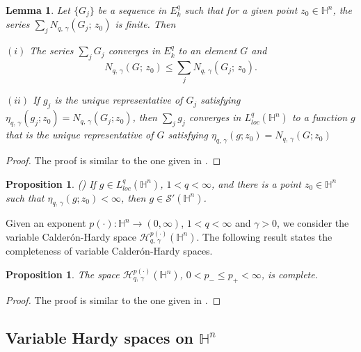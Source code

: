 \documentclass[oneside,10pt]{article}
\newtheorem{lemma}[theorem]{Lemma}
\newtheorem{proposition}[theorem]{Proposition}
\begin{document}
\begin{lemma} \label{series in Eqk} Let $\{ G_{j} \}$ be a sequence in $E^{q}_{k}$ such that for a given point $z_0 \in \mathbb{H}^n$, the series 
$\sum_j N_{q, \, \gamma}(G_{j}; \, z_0 )$ is finite. Then

$(i)$ The series $\sum_j G_j$ converges in $E_{k}^{q}$ to an element $G$ and 
$$N_{q, \, \gamma}(G; \, z_0 ) \leq \sum_j N_{q, \, \gamma}(G_{j}; \, z_0 ).$$

$(ii)$ If $g_j$ is the unique representative of $G_j$ satisfying
$\eta_{q, \, \gamma} (g_j; z_0) = N_{q, \, \gamma}(G_j; z_0)$, then $\sum_j g_j$ converges in $L^{q}_{loc}(\mathbb{H}^{n})$ to a function 
$g$ that is the unique representative of $G$ satisfying $\eta_{q, \, \gamma} (g; z_0) = N_{q, \, \gamma}(G; z_0)$
\end{lemma}

\begin{proof} The proof is similar to the one given in \cite[Lemma 4]{segovia}.
\end{proof}

\begin{proposition} (\cite[Proposition 15]{rocha5}) \label{g distrib}
If $g \in L^{q}_{loc}(\mathbb{H}^{n})$, $1 < q < \infty$, and there is a point $z_0 \in \mathbb{H}^{n}$ such that 
$\eta_{q, \, \gamma} (g ; z_0) < \infty$, then $g \in \mathcal{S}'(\mathbb{H}^{n})$.
\end{proposition}

Given an exponent $p(\cdot): \mathbb{H}^{n} \rightarrow (0, \infty)$, $1 < q < \infty$ and $\gamma > 0$, we consider the variable 
Calder\'on-Hardy  space $\mathcal{H}^{p(\cdot)}_{q, \, \gamma}(\mathbb{H}^{n})$. The following result states the completeness of variable Calder\'on-Hardy spaces.

\begin{proposition} \label{completeness} The space $\mathcal{H}^{p(\cdot)}_{q, \, \gamma}(\mathbb{H}^{n})$, $0 < p_{-} \leq p_{+} < \infty$, is complete.
\end{proposition}

\begin{proof} 
The proof is similar to the one given in \cite[Proposition 9]{rocha1}.
\end{proof}

\subsection{Variable Hardy spaces on $\mathbb{H}^{n}$}
\end{document}
